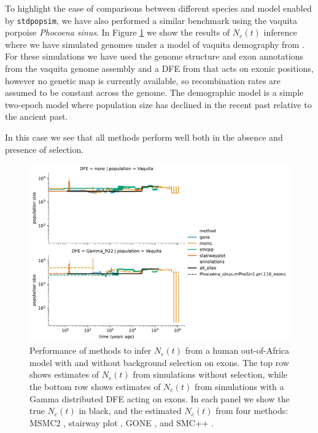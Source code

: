 \documentclass[hidelinks]{article}
\newcommand{\stdpopsim}{\texttt{stdpopsim}\xspace}
\begin{document}
To highlight the ease of comparisons between different species and model enabled by \stdpopsim,
we have also performed a similar benchmark using the vaquita porpoise \textit{Phocoena sinus}.
In Figure \ref{fig:1pop-vaquita-demography} we show the results of $N_e(t)$ inference
where we have simulated genomes under a model of vaquita demography from \cite{robinson2022critically}.
For these simulations we have used the genome structure and exon annotations from the vaquita genome assembly
and a DFE from \cite{robinson2022critically} that acts on exonic positions, however no genetic map 
is currently available, so recombination rates are assumed to be constant across the genome.
The demographic model is a simple two-epoch model where population size has declined in the recent past
relative to the ancient past. 

In this case we see that all methods perform well both in the absence and presence of selection.


\begin{figure}[t]
    \centering
    \includegraphics[width=\textwidth]{figures/PhoSin/Vaquita2Epoch_1R22/estimated_Ne_t_final}
    \caption{
    \label{fig:1pop-vaquita-demography}
    Performance of methods to infer $N_e(t)$ from a human out-of-Africa model \citep{ragsdale2019models}
    with and without background selection on exons. The top row shows estimates of $N_e(t)$ from simulations
    without selection, while the bottom row shows estimates of $N_e(t)$ from simulations with a Gamma distributed   
    DFE acting on exons. In each panel we show the true $N_e(t)$ in black, and the estimated $N_e(t)$ from four methods:    
    MSMC2 \citep{Schiffels2020}, stairway plot \citep{liu2020stairway}, GONE \citep{santiago2020recent}, and SMC++ \citep{terhorst2017robust}.  
    }
\end{figure}
\lipsum[20-25]
\end{document}
